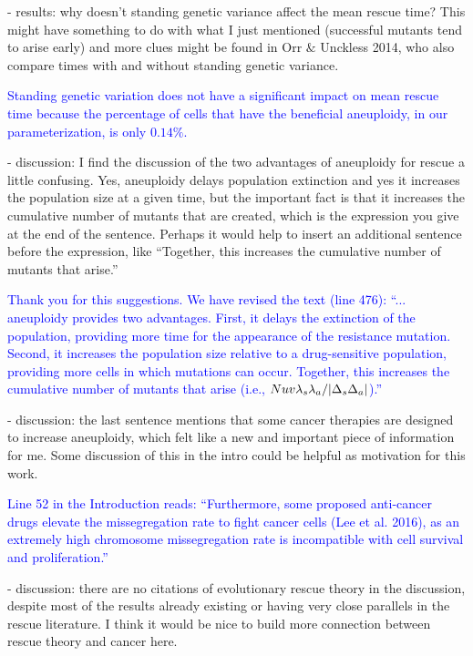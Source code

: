 \documentclass[12pt]{extarticle}
\begin{document}
- results: why doesn't standing genetic variance affect the mean rescue time? This might have something to do with what I just mentioned (successful mutants tend to arise early) and more clues might be found in Orr $\&$ Unckless 2014, who also compare times with and without standing genetic variance.

\textcolor{blue}{Standing genetic variation does not have a significant impact on mean rescue time because the percentage of cells that have the beneficial aneuploidy, in our parameterization, is only $0.14\%$.} 

- discussion: I find the discussion of the two advantages of aneuploidy for rescue a little confusing. Yes, aneuploidy delays population extinction and yes it increases the population size at a given time, but the important fact is that it increases the cumulative number of mutants that are created, which is the expression you give at the end of the sentence. Perhaps it would help to insert an additional sentence before the expression, like ``Together, this increases the cumulative number of mutants that arise.''

\textcolor{blue}{%
Thank you for this suggestions. We have revised the text (line 476): ``... aneuploidy provides two advantages. First, it delays the extinction of the population, providing more time for the appearance of the resistance mutation. Second, it increases the population size relative to a drug-sensitive population, providing more cells in which mutations can occur. Together, this increases the cumulative number of mutants that arise (i.e., $Nuv\lambda_s\lambda_a/\abs{\Delta_s\Delta_a}$).''
} 

- discussion: the last sentence mentions that some cancer therapies are designed to increase aneuploidy, which felt like a new and important piece of information for me. Some discussion of this in the intro could be helpful as motivation for this work.

\textcolor{blue}{%
Line 52 in the Introduction reads: ``Furthermore, some proposed anti-cancer drugs elevate the missegregation rate to fight cancer cells (Lee et al. 2016), as an extremely high chromosome missegregation rate is incompatible with cell survival and proliferation.''
} 

- discussion: there are no citations of evolutionary rescue theory in the discussion, despite most of the results already existing or having very close parallels in the rescue literature. I think it would be nice to build more connection between rescue theory and cancer here.
\end{document}
